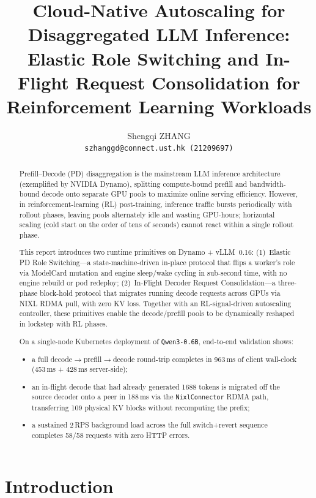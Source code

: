 \documentclass[10pt,twocolumn,letterpaper]{article}
\title{Cloud-Native Autoscaling for Disaggregated LLM Inference:\\Elastic Role Switching and In-Flight Request Consolidation for Reinforcement Learning Workloads}
\author{
Shengqi ZHANG\\
{\tt szhanggd@connect.ust.hk (21209697)} \\
}
\begin{document}
\maketitle

\begin{abstract}
Prefill--Decode (PD) disaggregation is the mainstream LLM inference architecture (exemplified by NVIDIA Dynamo), splitting compute-bound prefill and bandwidth-bound decode onto separate GPU pools to maximize online serving efficiency. However, in reinforcement-learning (RL) post-training, inference traffic bursts periodically with rollout phases, leaving pools alternately idle and wasting GPU-hours; horizontal scaling (cold start on the order of tens of seconds) cannot react within a single rollout phase.

This report introduces two runtime primitives on Dynamo + vLLM~0.16: (1)~Elastic PD Role Switching---a state-machine-driven in-place protocol that flips a worker's role via ModelCard mutation and engine sleep/wake cycling in sub-second time, with no engine rebuild or pod redeploy; (2)~In-Flight Decoder Request Consolidation---a three-phase block-hold protocol that migrates running decode requests across GPUs via NIXL RDMA pull, with zero KV loss. Together with an RL-signal-driven autoscaling controller, these primitives enable the decode/prefill pools to be dynamically reshaped in lockstep with RL phases.

On a single-node Kubernetes deployment of \texttt{Qwen3-0.6B}, end-to-end validation shows:
\begin{itemize}[nosep]
\item a full decode$\to$prefill$\to$decode round-trip completes in 963\,ms of client wall-clock (453\,ms + 428\,ms server-side);
\item an in-flight decode that had already generated 1688 tokens is migrated off the source decoder onto a peer in 188\,ms via the \texttt{NixlConnector} RDMA path, transferring 109 physical KV blocks without recomputing the prefix;
\item a sustained 2\,RPS background load across the full switch+revert sequence completes 58/58 requests with zero HTTP errors.
\end{itemize}
\end{abstract}

\section{Introduction}
\label{sec:intro}
\end{document}

